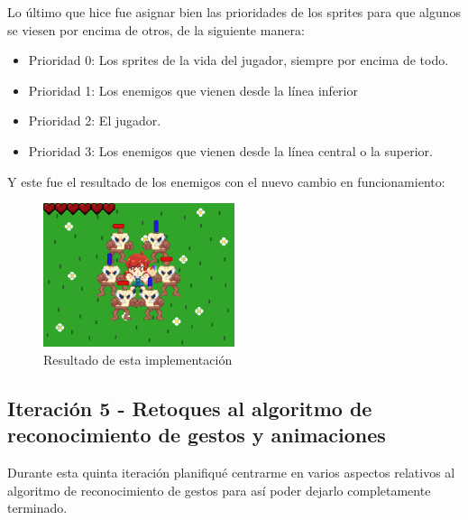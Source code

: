 \vspace{0.5cm}

Lo último que hice fue asignar bien las prioridades de los sprites para que algunos se viesen por encima de otros, de la siguiente manera:

\vspace{0.5cm}

\begin{itemize}
 \item Prioridad 0: Los sprites de la vida del jugador, siempre por encima de todo.
 \item Prioridad 1: Los enemigos que vienen desde la línea inferior
 \item Prioridad 2: El jugador.
 \item Prioridad 3: Los enemigos que vienen desde la línea central o la superior.
\end{itemize}

\vspace{0.5cm}

Y este fue el resultado de los enemigos con el nuevo cambio en funcionamiento:

\vspace{0.5cm}

\begin{figure}[htbp]
\centering
  \includegraphics[width=0.5\textwidth]{archivos/spawn_enemies_position_2.png}
  \caption{Resultado de esta implementación}
  \label{fig:spawn_enemies_position_2}
\end{figure}

\vspace{0.1cm}

\subsection{Iteración 5 - Retoques al algoritmo de reconocimiento de gestos y animaciones}

Durante esta quinta iteración planifiqué centrarme en varios aspectos relativos al algoritmo de reconocimiento de gestos para así poder dejarlo completamente terminado.

